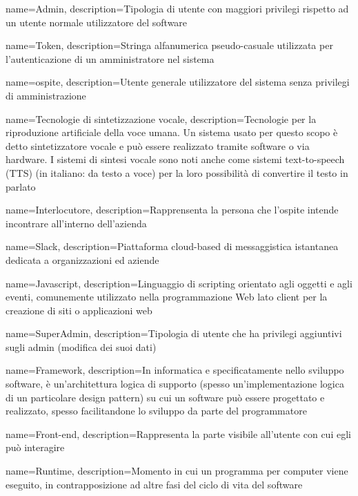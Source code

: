 {
  name=Admin,
  description={Tipologia di utente con maggiori privilegi rispetto ad un utente normale utilizzatore del software}
}

{
  name=Token,
  description={Stringa alfanumerica pseudo-casuale utilizzata per l'autenticazione di un amministratore nel sistema}
}

{
  name=ospite,
  description={Utente generale utilizzatore del sistema senza privilegi di amministrazione}
}

{
  name=Tecnologie di sintetizzazione vocale,
  description={Tecnologie per la riproduzione artificiale della voce umana. Un sistema usato per questo scopo è detto sintetizzatore vocale e può essere realizzato tramite software o via hardware. I sistemi di sintesi vocale sono noti anche come sistemi text-to-speech (TTS) (in italiano: da testo a voce) per la loro possibilità di convertire il testo in parlato}
}

{
  name=Interlocutore,
  description={Rapprensenta la persona che l'ospite intende incontrare all'interno dell'azienda}
}

{
  name=Slack,
  description={Piattaforma cloud-based di messaggistica istantanea dedicata a organizzazioni ed aziende}
}

{
  name=Javascript,
  description={Linguaggio di scripting orientato agli oggetti e agli eventi, comunemente utilizzato nella programmazione Web lato client per la creazione di siti o applicazioni web}
}

{
  name=SuperAdmin,
  description={Tipologia di utente che ha privilegi aggiuntivi sugli admin (modifica dei suoi dati)}
}

{
  name=Framework,
  description={In informatica e specificatamente nello sviluppo software, è un'architettura logica di supporto (spesso un'implementazione logica di un particolare design pattern) su cui un software può essere progettato e realizzato, spesso facilitandone lo sviluppo da parte del programmatore}
}

{
  name=Front-end,
  description={Rappresenta la parte visibile all'utente con cui egli può interagire}
}

{
  name=Runtime,
  description={Momento in cui un programma per computer viene eseguito, in contrapposizione ad altre fasi del ciclo di vita del software}
}

